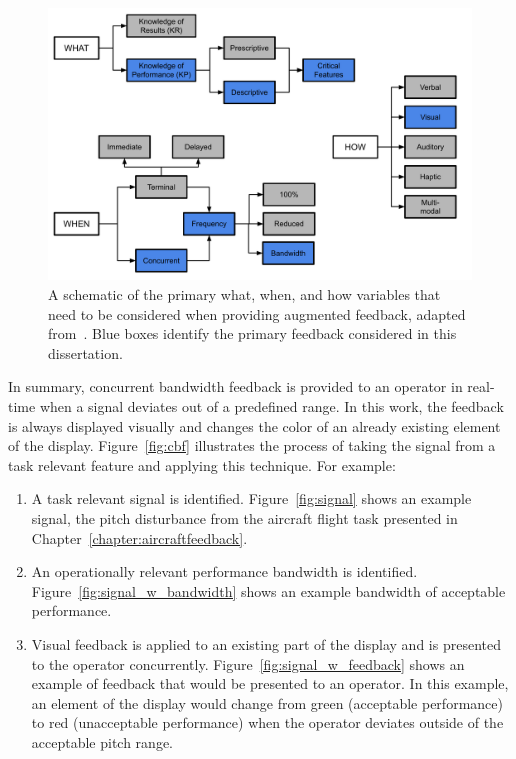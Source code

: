 \begin{figure}[tb]
    \begin{center}
        \includegraphics[width=\linewidth]{figures/Introduction/feedbackschematichighlighted.pdf}
        \caption[A schematic of the primary what, when, and how variables that need to be considered when providing augmented feedback]{A schematic of the primary what, when, and how variables that need to be considered when providing augmented feedback, adapted from~\citep{hodges2020skill}. Blue boxes identify the primary feedback considered in this dissertation.}
        \label{figure:afvariables}
    \end{center}
\end{figure}

In summary, concurrent bandwidth feedback is provided to an operator in real-time when a signal deviates out of a predefined range.
In this work, the feedback is always displayed visually and changes the color of an already existing element of the display.
Figure~\ref{fig:cbf} illustrates the process of taking the signal from a task relevant feature and applying this technique.
For example:
\begin{enumerate}
    \item A task relevant signal is identified.
          Figure~\ref{fig:signal} shows an example signal, the pitch disturbance from the aircraft flight task presented in Chapter~\ref{chapter:aircraftfeedback}.
    \item An operationally relevant performance bandwidth is identified.
          Figure~\ref{fig:signal_w_bandwidth} shows an example bandwidth of acceptable performance.
    \item Visual feedback is applied to an existing part of the display and is presented to the operator concurrently.
          Figure~\ref{fig:signal_w_feedback} shows an example of feedback that would be presented to an operator.
          In this example, an element of the display would change from green (acceptable performance) to red (unacceptable performance) when the operator deviates outside of the acceptable pitch range.
\end{enumerate}

